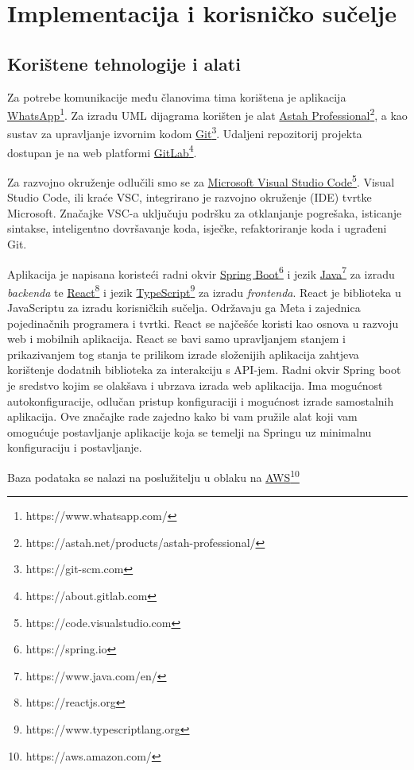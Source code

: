 \chapter{Implementacija i korisničko sučelje}


\section{Korištene tehnologije i alati}

\text
Za potrebe komunikacije među članovima tima korištena je aplikacija \underline{WhatsApp}\footnote{https://www.whatsapp.com/}.
Za izradu UML dijagrama korišten je alat \underline{Astah Professional}\footnote{https://astah.net/products/astah-professional/},
a kao sustav za upravljanje izvornim kodom \underline{Git}\footnote{https://git-scm.com}.
Udaljeni repozitorij projekta dostupan je na web platformi \underline{GitLab}\footnote{https://about.gitlab.com}.

\text
Za razvojno okruženje odlučili smo se za \underline{Microsoft Visual Studio Code}\footnote{https://code.visualstudio.com}.
Visual Studio Code, ili kraće VSC, integrirano je razvojno okruženje (IDE) tvrtke Microsoft.
Značajke VSC-a uključuju podršku za otklanjanje pogrešaka, isticanje sintakse, inteligentno dovršavanje koda, isječke, refaktoriranje
koda i ugrađeni Git.

\text
Aplikacija je napisana koristeći radni okvir \underline{Spring Boot}\footnote{https://spring.io} i jezik
\underline{Java}\footnote{https://www.java.com/en/} za izradu \textit{backenda} te
\underline{React}\footnote{https://reactjs.org} i jezik \underline{TypeScript}\footnote{https://www.typescriptlang.org}
za izradu \textit{frontenda}.
React je biblioteka u JavaScriptu za izradu korisničkih sučelja. Održavaju ga Meta i zajednica pojedinačnih programera i tvrtki.
React se najčešće koristi kao osnova u razvoju web i mobilnih aplikacija.
React se bavi samo upravljanjem stanjem i prikazivanjem tog stanja te prilikom izrade složenijih aplikacija zahtjeva korištenje
dodatnih biblioteka za interakciju s API-jem.
Radni okvir Spring boot je sredstvo kojim se olakšava i ubrzava izrada web aplikacija.
Ima mogućnost autokonfiguracije, odlučan pristup konfiguraciji i mogućnost izrade samostalnih aplikacija.
Ove značajke rade zajedno kako bi vam pružile alat koji vam omogućuje postavljanje aplikacije koja se temelji na Springu uz minimalnu konfiguraciju i postavljanje.

\text
Baza podataka se nalazi na poslužitelju u oblaku na \underline{AWS}\footnote{https://aws.amazon.com/}


